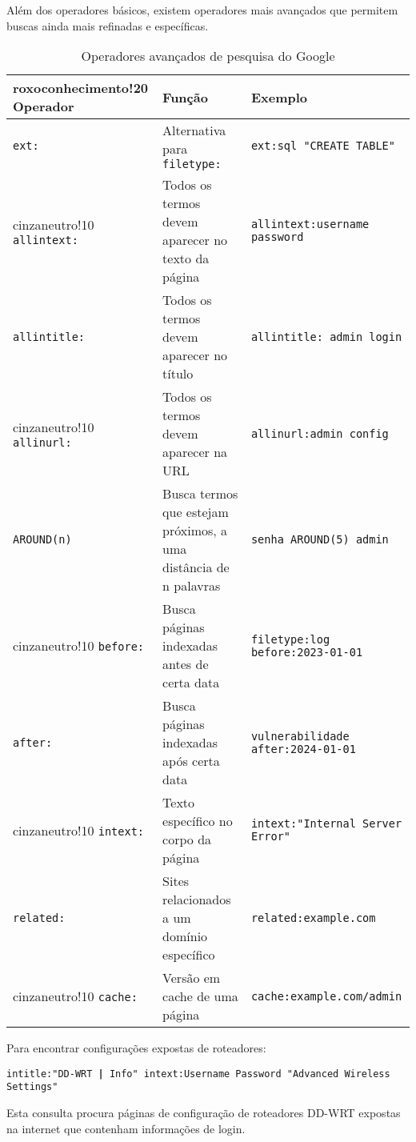 \documentclass[12pt,a4paper]{book}
\begin{document}
Além dos operadores básicos, existem operadores mais avançados que permitem buscas ainda mais refinadas e específicas.

\begin{table}[h]
\centering
\begin{tabular}{|p{2.5cm}|p{6cm}|p{5.5cm}|}
\hline
{roxoconhecimento!20} \textbf{Operador} & \textbf{Função} & \textbf{Exemplo} \\
\hline
\texttt{ext:} & Alternativa para \texttt{filetype:} & \texttt{ext:sql "CREATE TABLE"} \\
\hline
{cinzaneutro!10} \texttt{allintext:} & Todos os termos devem aparecer no texto da página & \texttt{allintext:username password} \\
\hline
\texttt{allintitle:} & Todos os termos devem aparecer no título & \texttt{allintitle: admin login} \\
\hline
{cinzaneutro!10} \texttt{allinurl:} & Todos os termos devem aparecer na URL & \texttt{allinurl:admin config} \\
\hline
\texttt{AROUND(n)} & Busca termos que estejam próximos, a uma distância de n palavras & \texttt{senha AROUND(5) admin} \\
\hline
{cinzaneutro!10} \texttt{before:} & Busca páginas indexadas antes de certa data & \texttt{filetype:log before:2023-01-01} \\
\hline
\texttt{after:} & Busca páginas indexadas após certa data & \texttt{vulnerabilidade after:2024-01-01} \\
\hline
{cinzaneutro!10} \texttt{intext:} & Texto específico no corpo da página & \texttt{intext:"Internal Server Error"} \\
\hline
\texttt{related:} & Sites relacionados a um domínio específico & \texttt{related:example.com} \\
\hline
{cinzaneutro!10} \texttt{cache:} & Versão em cache de uma página & \texttt{cache:example.com/admin} \\
\hline
\end{tabular}
\caption{Operadores avançados de pesquisa do Google}
\end{table}

\begin{examplebox}
Para encontrar configurações expostas de roteadores:

\texttt{intitle:"DD-WRT \textbf{|} Info" intext:Username Password "Advanced Wireless Settings"}

Esta consulta procura páginas de configuração de roteadores DD-WRT expostas na internet que contenham informações de login.
\end{examplebox}
\end{document}
